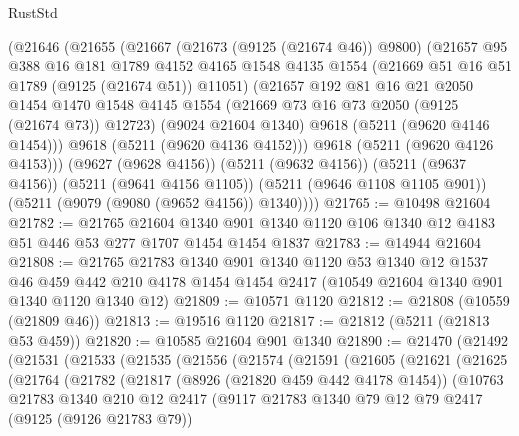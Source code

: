 \begin{lexlean}{RustStd}
\begin{coremodule}
    (@21646
      (@21655
        (@21667
          (@21673 (@9125 (@21674 @46)) @9800)
          (@21657
            @95
            @388
            @16
            @181
            @1789
            @4152
            @4165
            @1548
            @4135
            @1554
            (@21669 @51 @16 @51 @1789 (@9125 (@21674 @51)) @11051)
            (@21657
              @192
              @81
              @16
              @21
              @2050
              @1454
              @1470
              @1548
              @4145
              @1554
              (@21669 @73 @16 @73 @2050 (@9125 (@21674 @73)) @12723)
              (@9024 @21604 @1340)
              @9618
              (@5211 (@9620 @4146 @1454)))
            @9618
            (@5211 (@9620 @4136 @4152)))
          @9618
          (@5211 (@9620 @4126 @4153)))
        (@9627 (@9628 @4156))
        (@5211 (@9632 @4156))
        (@5211 (@9637 @4156))
        (@5211 (@9641 @4156 @1105))
        (@5211 (@9646 @1108 @1105 @901))
        (@5211 (@9079 (@9080 (@9652 @4156)) @1340))))
@21765 := @10498 @21604
@21782 := @21765
    @21604
    @1340
    @901
    @1340
    @1120
    @106
    @1340
    @12
    @4183
    @51
    @446
    @53
    @277
    @1707
    @1454
    @1454
    @1837
@21783 := @14944 @21604
@21808 := @21765
    @21783
    @1340
    @901
    @1340
    @1120
    @53
    @1340
    @12
    @1537
    @46
    @459
    @442
    @210
    @4178
    @1454
    @1454
    @2417
    (@10549 @21604 @1340 @901 @1340 @1120 @1340 @12)
@21809 := @10571 @1120
@21812 := @21808 (@10559 (@21809 @46))
@21813 := @19516 @1120
@21817 := @21812 (@5211 (@21813 @53 @459))
@21820 := @10585 @21604 @901 @1340
@21890 := @21470
    (@21492
      (@21531
        (@21533
          (@21535
            (@21556
              (@21574
                (@21591
                  (@21605
                    (@21621
                      (@21625
                        (@21764
                          (@21782
                            (@21817
                              (@8926 (@21820 @459 @442 @4178 @1454))
                              (@10763
                                @21783
                                @1340
                                @210
                                @12
                                @2417
                                (@9117
                                  @21783
                                  @1340
                                  @79
                                  @12
                                  @79
                                  @2417
                                  (@9125 (@9126 @21783 @79))

\end{coremodule}
\end{lexlean}
